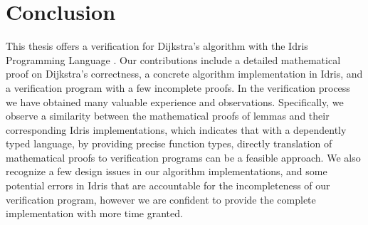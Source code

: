 \section{Conclusion}
This thesis offers a verification for Dijkstra's algorithm with the Idris Programming Language \cite{idris}. Our contributions include a detailed mathematical proof on Dijkstra's correctness, a concrete algorithm implementation in Idris, and a verification program with a few incomplete proofs. In the verification process we have obtained many valuable experience and observations. Specifically, we observe a similarity between the mathematical proofs of lemmas and their corresponding Idris implementations, which indicates that with a dependently typed language, by providing precise function types, directly translation of mathematical proofs to verification programs can be a feasible approach. We also recognize a few design issues in our algorithm implementations, and some potential errors in Idris that are accountable for the incompleteness of our verification program, however we are confident to provide the complete implementation with more time granted. 
